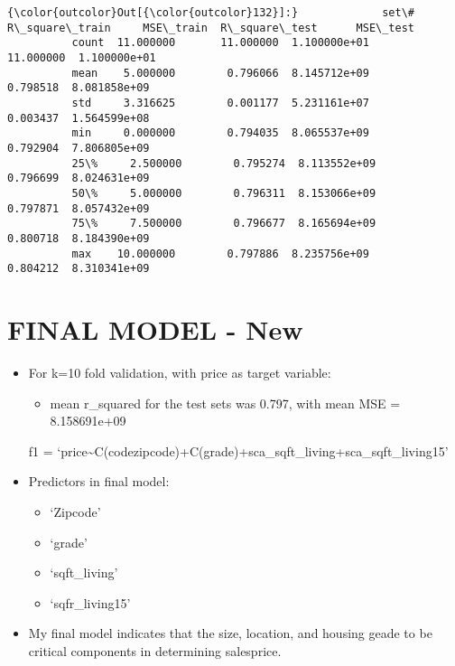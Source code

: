 \documentclass[11pt]{article}
\providecommand{\tightlist}{%
      \setlength{\itemsep}{0pt}\setlength{\parskip}{0pt}}
\begin{document}
\begin{Verbatim}[commandchars=\\\{\}]
{\color{outcolor}Out[{\color{outcolor}132}]:}             set\#  R\_square\_train     MSE\_train  R\_square\_test      MSE\_test
          count  11.000000       11.000000  1.100000e+01      11.000000  1.100000e+01
          mean    5.000000        0.796066  8.145712e+09       0.798518  8.081858e+09
          std     3.316625        0.001177  5.231161e+07       0.003437  1.564599e+08
          min     0.000000        0.794035  8.065537e+09       0.792904  7.806805e+09
          25\%     2.500000        0.795274  8.113552e+09       0.796699  8.024631e+09
          50\%     5.000000        0.796311  8.153066e+09       0.797871  8.057432e+09
          75\%     7.500000        0.796677  8.165694e+09       0.800718  8.184390e+09
          max    10.000000        0.797886  8.235756e+09       0.804212  8.310341e+09
\end{Verbatim}
            
    \hypertarget{final-model---new}{%
\section{FINAL MODEL - New}\label{final-model---new}}

\begin{itemize}
\tightlist
\item
  For k=10 fold validation, with price as target variable:

  \begin{itemize}
  \tightlist
  \item
    mean r\_squared for the test sets was 0.797, with mean MSE =
    8.158691e+09
  \end{itemize}

  f1 =
  `price\textasciitilde{}C(codezipcode)+C(grade)+sca\_sqft\_living+sca\_sqft\_living15'
\item
  Predictors in final model:

  \begin{itemize}
  \tightlist
  \item
    `Zipcode'
  \item
    `grade'
  \item
    `sqft\_living'
  \item
    `sqfr\_living15'
  \end{itemize}
\item
  My final model indicates that the size, location, and housing geade to
  be critical components in determining salesprice.
\end{itemize}
\end{document}
